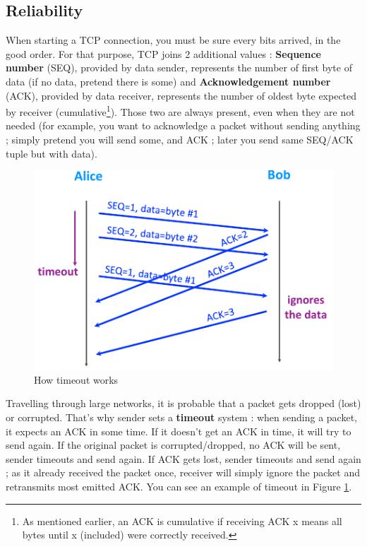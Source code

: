 \documentclass[12pt,a4paper]{article}
\begin{document}
\subsection{Reliability}
When starting a TCP connection, you must be sure every bits arrived, in the good order. For that purpose, TCP joins 2 additional values : \textbf{Sequence number} (SEQ), provided by data sender, represents the number of first byte of data (if no data, pretend there is some) and \textbf{Acknowledgement number} (ACK), provided by data receiver, represents the number of oldest byte expected by receiver (cumulative\footnote{As mentioned earlier, an ACK is cumulative if receiving ACK x means all bytes until x (included) were correctly received.}). Those two are always present, even when they are not needed (for example, you want to acknowledge a packet without sending anything ; simply pretend you will send some, and ACK ; later you send same SEQ/ACK tuple but with data).

\begin{figure}[h]
	\centering
	\includegraphics[scale=0.5]{images/timeout}
	\caption{How timeout works}
	\label{fig: timeout}
\end{figure}

Travelling through large networks, it is probable that a packet gets dropped (lost) or corrupted. That's why sender sets a \textbf{timeout} system : when sending a packet, it expects an ACK in some time. If it doesn't get an ACK in time, it will try to send again. If the original packet is corrupted/dropped, no ACK will be sent, sender timeouts and send again. If ACK gets lost, sender timeouts and send again ; as it already received the packet once, receiver will simply ignore the packet and retransmits most emitted ACK. You can see an example of timeout in Figure \ref{fig: timeout}.
\end{document}
